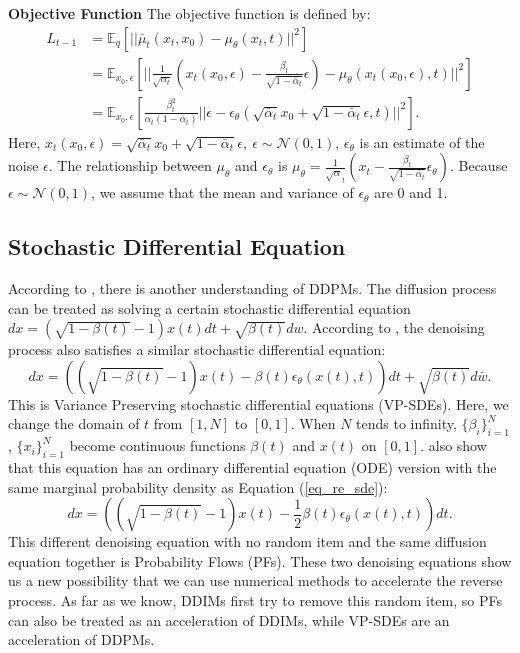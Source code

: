 \documentclass{article}
\begin{document}
\textbf{Objective Function} The objective function is defined by: 
\begin{equation}
   \begin{split}
      L_{t-1}  &= \mathbb{E}_q \left[||\bar{\mu}_t(x_t, x_0)-\mu_\theta(x_t, t)||^2\right] \\
               &= \mathbb{E}_{x_0, \epsilon} \left[||\frac{1}{\sqrt{\alpha_t}}\left(x_t(x_0,   \epsilon) - \frac{\beta_t}{\sqrt{1-\bar{\alpha}_t}}\epsilon\right) - \mu_\theta(x_t(x_0, \epsilon), t) ||^2\right] \\
               &= \mathbb{E}_{x_0, \epsilon}\left[\frac{\beta_t^2}{\alpha_t(1-\bar{\alpha}_t)}||\epsilon - \epsilon_\theta(\sqrt{\bar{\alpha}_t}x_0+ \sqrt{1-\bar{\alpha}_t}\epsilon, t)||^2\right].
   \end{split}
   \label{ob_func_raw}
\end{equation}
Here, $x_t(x_0, \epsilon)= \sqrt{\bar{\alpha}_t}x_0 + \sqrt{1-\bar{\alpha}_t}\epsilon,\ \epsilon\sim \mathcal{N}(0,1)$, $\epsilon_\theta$ is an estimate of the noise $\epsilon$. The relationship between $\mu_\theta$ and $\epsilon_\theta$ is $\mu_\theta=\frac{1}{\sqrt{\alpha}_t}(x_t-\frac{\beta_t}{\sqrt{1-\bar{\alpha}_t}}\epsilon_\theta)$. Because $\epsilon \sim \mathcal{N}(0, 1)$, we assume that the mean and variance of $\epsilon_\theta$ are 0 and 1.



\subsection{Stochastic Differential Equation}
According to \citet{Song2020}, there is another understanding of DDPMs. The diffusion process can be treated as solving a certain stochastic differential equation $dx = (\sqrt{1-\beta(t)}-1)x(t)dt + \sqrt{\beta(t)}dw$. According to \citet{Anderson1982}, the denoising process also satisfies a similar stochastic differential equation:
\begin{equation}
   dx = \left((\sqrt{1-\beta(t)}-1)x(t) - \beta(t)\epsilon_\theta(x(t), t)\right)dt + \sqrt{\beta(t)}d\bar{w}.
   \label{eq_re_sde}
\end{equation}
This is Variance Preserving stochastic differential equations (VP-SDEs). Here, we change the domain of $t$ from $[1, N]$ to $[0,1]$. When $N$ tends to infinity, $\{\beta_i\}_{i=1}^N$, $\{x_i\}_{i=1}^N$ become continuous functions $\beta(t)$ and $x(t)$ on $[0,1]$. \citet{Song2020} also show that this equation has an ordinary differential equation (ODE) version with the same marginal probability density as Equation (\ref{eq_re_sde}):
\begin{equation}
   dx = \left((\sqrt{1-\beta(t)}-1)x(t) - \frac{1}{2}\beta(t)\epsilon_\theta(x(t), t)\right)dt.
   \label{reverse_ode}
\end{equation}
This different denoising equation with no random item and the same diffusion equation together is Probability Flows (PFs). These two denoising equations show us a new possibility that we can use numerical methods to accelerate the reverse process. As far as we know, DDIMs first try to remove this random item, so PFs can also be treated as an acceleration of DDIMs, while VP-SDEs are an acceleration of DDPMs.
\end{document}

